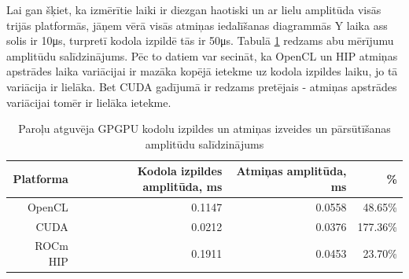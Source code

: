 Lai gan šķiet, ka izmērītie laiki ir diezgan haotiski un ar lielu amplitūda
visās trijās platformās, jāņem vērā visās atmiņas iedalīšanas diagrammās Y
laika ass solis ir 10\si{\micro\second}, turpretī kodola izpildē tās ir
50\si{\micro\second}. Tabulā \ref{tab:amplitudas} redzams abu mērījumu
amplitūdu salīdzinājums. Pēc to datiem var secināt, ka OpenCL un HIP atmiņas
apstrādes laika variācijai ir mazāka kopējā ietekme uz kodola izpildes laiku,
jo tā variācija ir lielāka. Bet CUDA gadījumā ir redzams pretējais - atmiņas
apstrādes variācijai tomēr ir lielāka ietekme.

\begin{table}[H]
    \centering
    \caption{Paroļu atguvēja GPGPU kodolu izpildes un atmiņas izveides un
    pārsūtīšanas amplitūdu salīdzinājums}
\label{tab:amplitudas}
\begin{tabular}{rrrr}
    Platforma & Kodola izpildes amplitūda, ms & Atmiņas amplitūda, ms& \% \\ \hline
OpenCL & 0.1147 & 0.0558 & 48.65\% \\
CUDA & 0.0212 & 0.0376 & 177.36\% \\
ROCm HIP & 0.1911 & 0.0453 & 23.70\% \\
\hline
\end{tabular}
\end{table}
